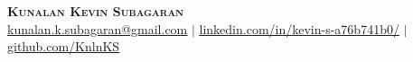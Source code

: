 \begin{center}
	\textbf{\Huge \scshape Kunalan Kevin Subagaran} \\ \vspace{1pt}
    \href{kunalan.k.subagaran@gmail.com}{\underline{kunalan.k.subagaran@gmail.com}} $|$ 
	\href{https://www.linkedin.com/in/kevin-s-a76b741b0/}{\underline{linkedin.com/in/kevin-s-a76b741b0/}} $|$
	\href{https://github.com/KnlnKS}{\underline{github.com/KnlnKS}}
\end{center}